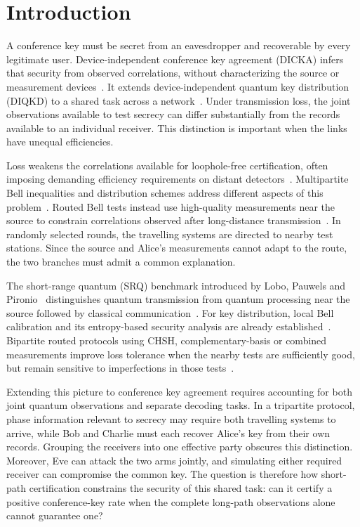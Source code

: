 \documentclass[aps,10pt,onecolumn,prx,superscriptaddress,longbibliography,nofootinbib]{revtex4-2}
\begin{document}
\section{Introduction}\label{sec:introduction}

A conference key must be secret from an eavesdropper and recoverable by every legitimate user. Device-independent conference key agreement (DICKA) infers that security from observed correlations, without characterizing the source or measurement devices~\cite{Brunner2014,Ribeiro2018,Holz2020,Murta2020}. It extends device-independent quantum key distribution (DIQKD) to a shared task across a network~\cite{Ekert1991,Acin2007,Primaatmaja2023,Epping2017}. Under transmission loss, the joint observations available to test secrecy can differ substantially from the records available to an individual receiver. This distinction is important when the links have unequal efficiencies.

Loss weakens the correlations available for loophole-free certification, often imposing demanding efficiency requirements on distant detectors~\cite{ClauserHorne1974,MassarPironio2003}. Multipartite Bell inequalities and distribution schemes address different aspects of this problem~\cite{Holz2020,Grasselli2023,Ishihara2025,Azuma2023}. Routed Bell tests instead use high-quality measurements near the source to constrain correlations observed after long-distance transmission~\cite{Chaturvedi2024,Lobo2024}. In randomly selected rounds, the travelling systems are directed to nearby test stations. Since the source and Alice's measurements cannot adapt to the route, the two branches must admit a common explanation.

The short-range quantum (SRQ) benchmark introduced by Lobo, Pauwels and Pironio~\cite{Lobo2024} distinguishes quantum transmission from quantum processing near the source followed by classical communication~\cite{Masini2024}. For key distribution, local Bell calibration and its entropy-based security analysis are already established~\cite{Lim2013,TanWolf2024}. Bipartite routed protocols using CHSH, complementary-basis or combined measurements improve loss tolerance when the nearby tests are sufficiently good, but remain sensitive to imperfections in those tests~\cite{LeRoy2025}.

Extending this picture to conference key agreement requires accounting for both joint quantum observations and separate decoding tasks. In a tripartite protocol, phase information relevant to secrecy may require both travelling systems to arrive, while Bob and Charlie must each recover Alice's key from their own records. Grouping the receivers into one effective party obscures this distinction. Moreover, Eve can attack the two arms jointly, and simulating either required receiver can compromise the common key. The question is therefore how short-path certification constrains the security of this shared task: can it certify a positive conference-key rate when the complete long-path observations alone cannot guarantee one?
\end{document}
